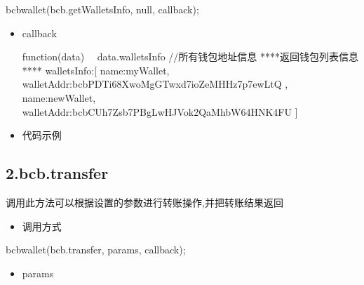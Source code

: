 \documentclass[letterpaper,10pt,english]{sphinxmanual}
\begin{document}
\begin{sphinxVerbatim}[commandchars=\\\{\}]
bcbwallet(\PYGZsq{}bcb.getWalletsInfo\PYGZsq{}, null, callback);
\end{sphinxVerbatim}
\begin{itemize}
\item {} 
callback

\begin{sphinxVerbatim}[commandchars=\\\{\}]
function(data) \PYGZob{}
　data.walletsInfo //所有钱包地址信息
\PYGZcb{}
****返回钱包列表信息****
walletsInfo:[
  \PYGZob{}
      \PYGZdq{}name\PYGZdq{}:\PYGZdq{}myWallet\PYGZdq{},
      \PYGZdq{}walletAddr\PYGZdq{}:\PYGZdq{}bcbPDTi68XwoMgGTwxd7ioZeMHHz7p7ewLtQ\PYGZdq{}
  \PYGZcb{},
  \PYGZob{}
      \PYGZdq{}name\PYGZdq{}:\PYGZdq{}newWallet\PYGZdq{},
        \PYGZdq{}walletAddr\PYGZdq{}:\PYGZdq{}bcbCUh7Zsb7PBgLwHJVok2QaMhbW64HNK4FU\PYGZdq{}
  \PYGZcb{}
]
\end{sphinxVerbatim}

\item {} 
代码示例

\end{itemize}

\begin{sphinxVerbatim}[commandchars=\\\{\}]
    
\end{sphinxVerbatim}


\subsection{2.bcb.transfer}
\label{\detokenize{jsapi:bcb-transfer}}
调用此方法可以根据设置的参数进行转账操作,并把转账结果返回
\begin{itemize}
\item {} 
调用方式

\end{itemize}

\begin{sphinxVerbatim}[commandchars=\\\{\}]
bcbwallet(\PYGZsq{}bcb.transfer\PYGZsq{}, params, callback);
\end{sphinxVerbatim}
\begin{itemize}
\item {} 
params

\end{itemize}
\end{document}
